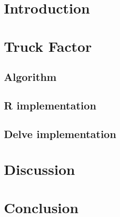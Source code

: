 \section{Introduction}


\section{Truck Factor}

\subsection{Algorithm}

\subsection{R implementation}

\subsection{Delve implementation}

\section {Discussion}

\section{Conclusion}
